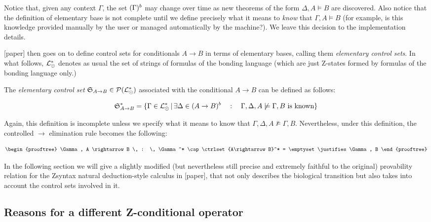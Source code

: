 Notice that, given any context $\Gamma$, the set $(\Gamma)^{b}$ may change
over time as new theorems of the form $\Delta, A \models B$ are discovered.
Also notice that the definition of elementary base is not complete until we
define precisely what it means to \emph{know} that $\Gamma, A \models B$ (for
example, is this knowledge provided manually by the user or managed
automatically by the machine?). We leave this decision to the implementation
details.

[paper] then goes on to define control sets for conditionals $A \rightarrow B$
in terms of elementary bases, calling them \emph{elementary control sets}.  In
what follows, $\mathcal{L}_{\odot}^*$ denotes as usual the set of strings of formulas
of the bonding language (which are just Z-states formed by formulas of the
bonding language only.)

\begin{definition}
  The \emph{elementary control set}
  $\mathfrak{S}_{A \rightarrow B} \in \mathcal{P}(\mathcal{L}_{\odot}^*)$ associated with
  the conditional $A \rightarrow B$ can be defined as follows:

  \[
    \mathfrak{S}_{A \rightarrow B}^* = \{
    \Gamma \in \mathcal{L}_{\odot}^* \, | \, \exists \Delta \in (A \rightarrow
    B)^{b}
    \quad : \quad \Gamma, \Delta, A \not \models \Gamma, B \text{ is known}
    \}
  \]
\end{definition}

Again, this definition is incomplete unless we specify what it means to know
that $\Gamma, \Delta, A \not \models \Gamma, B$. Nevertheless, under this
definition, the controlled $\rightarrow$ elimination rule becomes the following:

\[
  \begin{prooftree}
    \Gamma, A \rightarrow B \, : \, \Gamma^* \cap \ctrlset{A\rightarrow B}^* =
    \emptyset
    \justifies
    \Gamma, B
  \end{prooftree}
\]

In the following section we will give a slightly modified (but nevertheless
still precise and extremely faithful to the original) provability relation for
the Zsyntax natural deduction-style calculus in [paper], that not only describes
the biological transition but also takes into account the control sets involved
in it.

\subsection{Reasons for a different Z-conditional operator}

